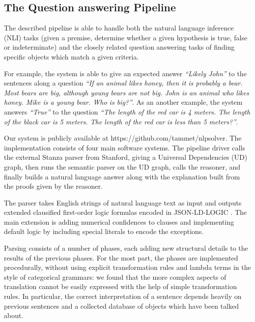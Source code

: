 \documentclass[runningheads]{llncs}
\begin{document}
\subsection{The Question answering Pipeline}

The described pipeline is able to handle both the natural language inference (NLI) tasks
(given a premise, determine whether a given hypothesis is true, false or indeterminate) and the closely
related question answering tasks of finding specific objects which match
a given criteria.

For example, the system is able to give an expected answer {\em ``Likely John''} to the sentences along a question
{\em ``If an animal likes honey, then it is probably a bear. Most bears are big, although young bears are not big.
 John is an animal who likes honey. Mike is a young bear. Who is big?''}.
As an another example, the system answers  {\em ``True''} to the question
{\em ``The length of the red car is 4 meters. The length of the black car is 5 meters.   
 The length of the red car is less than 5 meters?''}.
 
Our system is publicly available at https://github.com/tammet/nlpsolver.
The implementation consists of four main software systems. The pipeline driver
calls the external Stanza parser \cite{qi2020stanza} from Stanford, giving a Universal Dependencies (UD) \cite{de2021universal} graph, 
then runs the semantic parser on the UD graph, calls the reasoner, and finally
builds a natural language answer along with the explanation built from the proofs 
given by the reasoner. 

The parser takes English strings of natural language text as input and outputs
extended clausified first-order logic formulas encoded in JSON-LD-LOGIC \cite{ref_json_ld_logic}.
The main extension is adding numerical confidences to clauses and 
implementing default logic by including special literals to encode the exceptions.

Parsing consists of a number of phases, each adding new structural details to
the results of the previous phases.
For the most part, the phases are implemented procedurally,
without using explicit transformation rules and lambda terms in 
the style of categorical grammars: we found that the more complex aspects of 
translation cannot be easily expressed with the help of simple transformation rules. 
In particular, the correct interpretation of a sentence depends heavily on 
previous sentences and a collected database of objects which have been talked about.
\end{document}

